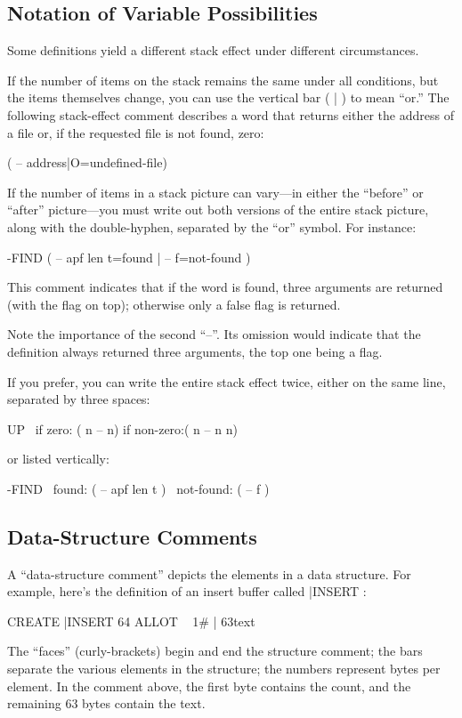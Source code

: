 \othersidetrue\subsection{Notation of Variable Possibilities}
\othersidefalse
Some definitions yield a different stack effect under different circumstances.

If the number of items on the stack remains the same under all conditions,
but the items themselves change, you can use the vertical bar ( | )
to mean ``or.'' The following stack-effect comment describes a word that
returns either the address of a file or, if the requested file is not found,
zero:
\begin{Code}
( -- address|O=undefined-file)
\end{Code}
If the number of items in a stack picture can vary---in either the ``before''
or ``after'' picture---you must write out both versions of the entire stack
picture, along with the double-hyphen, separated by the ``or'' symbol.  For
instance:
\begin{Code}
-FIND ( -- apf len t=found | -- f=not-found )
\end{Code}
This comment indicates that if the word is found, three arguments are
returned (with the flag on top); otherwise only a false flag is returned.

Note the importance of the second ``--''.  Its omission would indicate
that the definition always returned three arguments, the top one being a
flag.

If you prefer, you can write the entire stack effect twice, either on
the same line, separated by three spaces:
\begin{Code}
  UP \ if zero: ( n -- n)    if non-zero:( n -- n n)
\end{Code}
or listed vertically:
\begin{Code}
-FIND  \     found: ( -- apf len t )
       \ not-found: ( -- f )
\end{Code}
\subsection{Data-Structure Comments}

A ``data-structure comment'' depicts the elements in a data structure.
For example, here's the definition of an insert buffer called |INSERT :
\begin{Code}
CREATE |INSERT  64 ALLOT  \  { 1# | 63text }
\end{Code}
The ``faces'' (curly-brackets) begin and end the structure comment; the
bars separate the various elements in the structure; the numbers represent
bytes per element.  In the comment above, the first byte contains the
count, and the remaining 63 bytes contain the text.

